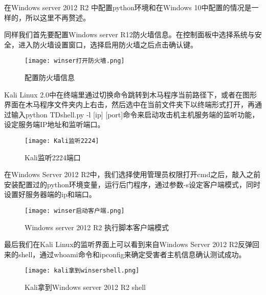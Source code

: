 在Windows server 2012 R2 中配置python环境和在Windows 10中配置的情况是一样的，所以这里不再赘述。


同样我们首先要配置Windows server R12防火墙信息。在控制面板中选择系统与安全，进入防火墙设置窗口，选择启用防火墙之后点击确认键。\\

\begin{figure}[h]
\centering
\texttt{[image: winser打开防火墙.png]}
\caption{配置防火墙信息}
\label{fig:7}
\end{figure}



Kali Linux 2.0中在终端里通过切换命令跳转到木马程序当前路径下，或者在图形界面在木马程序文件夹内上右击，然后选中在当前文件夹下以终端形式打开，再通过输入python TDshell.py -l [ip] [port]命令来启动攻击机主机服务端的监听功能，设定服务端IP地址和监听端口。
\begin{figure}[!h]
\centering
\texttt{[image: Kali监听2224]}
\caption{Kali监听2224端口}
\label{fig:3}
\end{figure}



在Windows Server 2012 R2中，我们选择使用管理员权限打开cmd之后，敲入之前安装配置过的python环境变量，运行后门程序，通过参数-s设定客户端模式，同时设置好服务器端的ip和端口。
\begin{figure}[!h]
\centering
\texttt{[image: winser启动客户端.png]}
\caption{Windows server 2012 R2 执行脚本客户端模式}
\label{fig:4}
\end{figure}




最后我们在Kali Linux的监听界面上可以看到来自Windows Server 2012 R2反弹回来的shell，通过whoami命令和ipconfig来确定受害者主机信息确认测试成功。
\begin{figure}[!h]
\centering
\texttt{[image: kali拿到winsershell.png]}
\caption{Kali拿到Windows server 2012 R2 shell}
\label{fig:5}
\end{figure}



